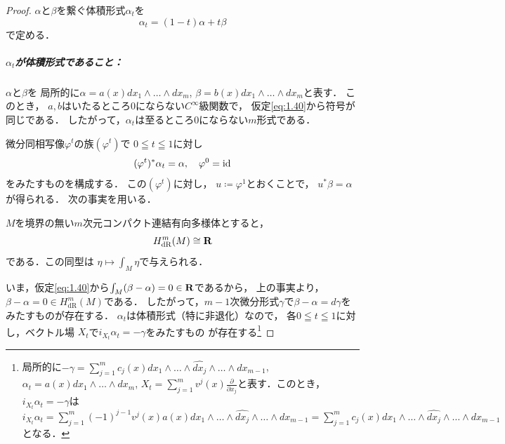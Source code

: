 \begin{proof}
    \(\alpha\)と\(\beta\)を繋ぐ体積形式\(\alpha_t\)を
    \[
        \alpha_t=(1-t)\alpha+t\beta
    \]で定める．
    \subparagraph*{\(\alpha_t\)が体積形式であること：}
    \(\alpha\)と\(\beta\)を
    局所的に\(\alpha=a(x)dx_1\wedge\dots\wedge dx_m\), 
    \(\beta=b(x)dx_1\wedge\dots\wedge dx_m\)と表す．
    このとき，
    \(a,b\)はいたるところ\(0\)にならない\(C^\infty\)級関数で，
    仮定\eqref{eq:1.40}から符号が同じである．
    したがって，\(\alpha_t\)は至るところ\(0\)にならない\(m\)形式である．

    微分同相写像\(\varphi^{t}\)の族\((\varphi^t)\)で
    \(0\leqq t\leqq 1\)に対し\begin{equation}
        (\varphi^t)^{\ast}\alpha_{t}=\alpha,
        \quad
        \varphi^0=\mathop{\mathrm{id}}\nolimits\label{eq:1.41}
    \end{equation}をみたすものを構成する．
    この\((\varphi^t)\)に対し，
    \(u\coloneqq \varphi^1\)とおくことで，
    \(u^{\ast}\beta=\alpha\)が得られる．
    次の事実を用いる．
    \begin{FACT*}
        \(M\)を境界の無い\(m\)次元コンパクト連結有向多様体とすると，
        \[H^{m}_{\mathrm{dR}}(M)\cong\mathbf{R}\]である．この同型は
        \(\eta\mapsto\int_{M}^{}\eta\)で与えられる．
    \end{FACT*}
    いま，仮定\eqref{eq:1.40}から\(
        \int_{M}^{}(\beta-\alpha)=0\in\mathbf{R}
    \)であるから，
    上の事実より，\(
        \beta-\alpha=0\in H^{m}_{\mathrm{dR}}(M)
    \)である．
    したがって，\(m-1\)次微分形式\(\gamma\)で\(
        \beta-\alpha=d\gamma
    \)をみたすものが存在する．
    \(\alpha_t\)は体積形式（特に非退化）なので，
    各\(0\leqq t\leqq 1\)に対し，ベクトル場
    \(X_t\)で\(i_{X_{t}}\alpha_t=-\gamma\)をみたすもの
    が存在する\footnote{
        局所的に\(
            -\gamma=
            \sum_{j=1}^{m}c_{j}(x)
            dx_1\wedge\dots\wedge 
            \widehat{dx_{j}}
            \wedge\dots\wedge dx_{m-1}
        \), \(
            \alpha_t=a(x)dx_1\wedge\dots\wedge dx_{m}
        \), \(
            X_t
            =\sum_{j=1}^{m}
            v^{j}(x)\frac{\partial}{\partial x_j}
        \)と表す．このとき，\(i_{X_{t}}\alpha_t=-\gamma\)は
        \(
            i_{X_{t}}\alpha_t
            =
            \sum_{j=1}^{m}
            (-1)^{j-1}v^{j}(x)a(x)
            dx_1\wedge\dots\wedge 
            \widehat{dx_{j}}
            \wedge\dots\wedge dx_{m-1}
            =\sum_{j=1}^{m}c_{j}(x)
            dx_1\wedge\dots\wedge 
            \widehat{dx_{j}}
            \wedge\dots\wedge dx_{m-1}
        \)となる．
}
\end{proof}
